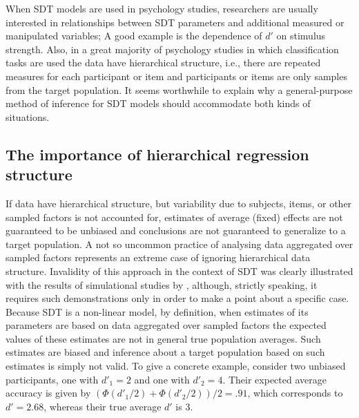 \documentclass[oneside,a4paper]{article}
\begin{document}
When SDT models are used in psychology studies, researchers are
usually interested in relationships between SDT parameters and
additional measured or manipulated
variables; A good example is the dependence of $d'$ on stimulus
strength. Also, in a great majority of psychology studies in which
classification tasks are used the data have hierarchical structure,
i.e., there are repeated measures for each participant or item and
participants or items are only samples from the target population. It
seems worthwhile to explain why a general-purpose method of inference
for SDT models should accommodate both kinds of situations.

\subsection{The importance of hierarchical regression structure}

If data have hierarchical structure, but variability due to subjects,
items, or other sampled factors is not accounted for, estimates of
average (fixed) effects are not guaranteed to be unbiased and
conclusions are not guaranteed to generalize to a target population. A
not so uncommon practice of analysing data aggregated over sampled
factors represents an extreme case of ignoring
hierarchical data structure. Invalidity of this approach in the
context of SDT was clearly illustrated with the results of
simulational studies by , although,
strictly speaking, it requires such demonstrations only in order to
make a point about a specific case. Because SDT is a non-linear model,
by definition, when estimates of its parameters are based on data
aggregated over sampled factors the expected values of these estimates
are not in general true population averages. Such estimates are
biased and inference about a target population based on such estimates
is simply not valid. To give a concrete example, consider two unbiased
participants, one with $d'_1 = 2$ and one with $d'_2 = 4$. Their
expected average accuracy is given by
$(\Phi(d'_1/2) + \Phi(d'_2/2)) / 2 = .91$, which corresponds to
$d' = 2.68$, whereas their true average $d'$ is $3$.
\end{document}
